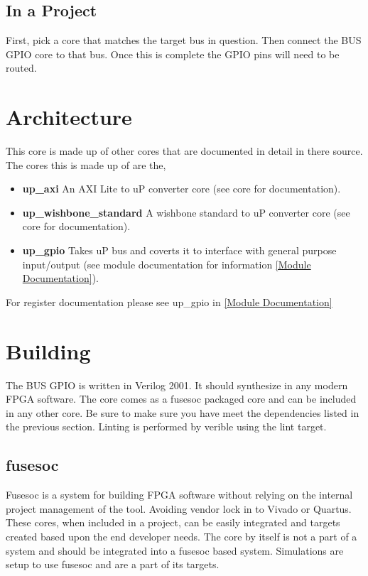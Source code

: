 





\subsection{In a Project}
\par
First, pick a core that matches the target bus in question. Then connect the BUS GPIO core to that bus. Once this is complete the GPIO pins will need
to be routed.

\section{Architecture}
\par
This core is made up of other cores that are documented in detail in there source. The cores this is made up of are the,
\begin{itemize}
  \item \textbf{up\_axi} An AXI Lite to uP converter core (see core for documentation).
  \item \textbf{up\_wishbone\_standard} A wishbone standard to uP converter core (see core for documentation).
  \item \textbf{up\_gpio} Takes uP bus and coverts it to interface with general purpose input/output (see module documentation for information \ref{Module Documentation}).
\end{itemize}

For register documentation please see up\_gpio in \ref{Module Documentation}

\section{Building}

\par
The BUS GPIO is written in Verilog 2001. It should synthesize in any modern FPGA software. The core comes as a fusesoc packaged core and can be included in any other core. Be sure to make sure you have meet the dependencies listed in the previous section. Linting is performed by verible using the lint target.

\subsection{fusesoc}
\par
Fusesoc is a system for building FPGA software without relying on the internal project management of the tool. Avoiding vendor lock in to Vivado or Quartus.
These cores, when included in a project, can be easily integrated and targets created based upon the end developer needs. The core by itself is not a part of
a system and should be integrated into a fusesoc based system. Simulations are setup to use fusesoc and are a part of its targets.

